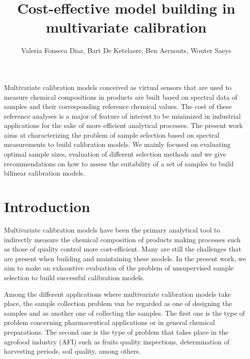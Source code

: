 \documentclass{article}
\renewenvironment{abstract}
  {{\bfseries\noindent{\abstractname}\par\nobreak}\footnotesize}
  {\bigskip}
\begin{document}
\title{Cost-effective model building in multivariate calibration}


\author[ ]{Valeria Fonseca Diaz, Bart De Ketelaere, Ben Aernouts, Wouter Saeys}

\affil[ ]{}
\vspace{-1em}


\date{}

\begingroup
\let\center\flushleft
\let\endcenter\endflushleft
\maketitle
\endgroup

\begin{abstract}
{
Multivariate calibration models conceived as virtual sensors that are used to measure chemical compositions in products are built based on spectral data of samples and their corresponding reference chemical values. The cost of these reference analyses is a major of feature of interest to be minimized in industrial applications for the sake of more efficient analytical processes. The present work aims at characterizing the problem of sample selection based on spectral measurements to build calibration models. We mainly focused on evaluating optimal sample sizes, evaluation of different selection methods and we give recommendations on how to assess the suitability of a set of samples to build bilinear calibration models.
}\\%
\end{abstract}%



\section*{Introduction}\label{introduction}

Multivariate calibration models have been the primary analytical tool to indirectly measure the chemical composition of products making processes such as those of quality control more cost-efficient. Many are still the challenges that are present when building and maintaining these models. In the present work, we aim to make an exhaustive evaluation of the problem of unsupervised sample selection to build successful calibration models. 

Among the different applications where multivariate calibration models take place, the sample collection problem van be regarded as one of designing the samples and as another one of collecting the samples. The first one is the type of problem concerning pharmaceutical applications or in general chemical preparations. The second one is the type of problem that takes place in the agrofood industry (AFI) such as fruits quality inspections, determination of harvesting periods, soil quality, among others. 
\end{document}

